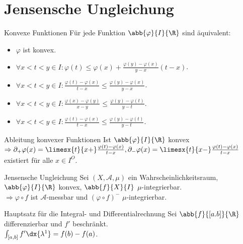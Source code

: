 \section*{Jensensche Ungleichung}

\begin{karte}{Konvexe Funktionen}
	Für jede Funktion \( \abb{\varphi}{I}{\R} \) sind äquivalent: 
	\begin{itemize}
		\item \( \varphi \) ist konvex.
		\item \( \forall x < t < y\in I: \varphi(t) \leq \varphi(x) + \frac{\varphi(y) - \varphi(x)}{y - x}(t - x) \).
		\item \( \forall x < t < y \in I: 
		\frac{\varphi(t) - \varphi(x)}{t - x} \leq \frac{\varphi(y) - \varphi(x)}{y - x} \).
		\item \( \forall x < t < y \in I: 
		\frac{\varphi(x) - \varphi(y)}{x - y} 
		\leq \frac{\varphi(y) - \varphi(t)}{y - t} \).
		\item \( \forall x < t < y \in I: 
		\frac{\varphi(t) - \varphi(x)}{t - x} 
		\leq \frac{\varphi(y) - \varphi(t)}{y - t} \).
	\end{itemize}
\end{karte}

\begin{karte}{Ableitung konvexer Funktionen}
	Ist \( \abb{\varphi}{I}{\R} \) konvex 
	\(\Rightarrow \partial_+ \varphi(x) = \limesx{t}{x+} \frac{\varphi(t) - \varphi(x)}{t - x}, 
	\partial_- \varphi(x) = \limesx{t}{x-} \frac{\varphi(t) - \varphi(x)}{t - x} \)
	existiert für alle \( x\in I^O \).
\end{karte}

\begin{karte}{Jensensche Ungleichung}
	Sei \( (X, \mathcal{A}, \mu) \) ein Wahrscheinlichkeitsraum, 
	\( \abb{\varphi}{I}{\R} \) konvex, 
	\( \abb{f}{X}{I} \) \(\mu\)-integrierbar.\\
	\( \Rightarrow \varphi \circ f \) ist \( \mathcal{A} \)-messbar und 
	\( (\varphi \circ f)^- \) \(\mu\)-integrierbar.
\end{karte}

\begin{karte}{Hauptsatz für die Integral- und Differentialrechnung}
	Sei \( \abb{f}{[a.b]}{\R} \) differenzierbar und \(f'\) beschränkt. \\
	\( \int_{[a,b]} f' \dx{\lambda^1} = f(b) - f(a) \).
\end{karte}